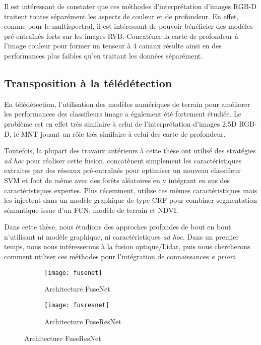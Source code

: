 Il est intéressant de constater que ces méthodes d'interprétation d'images \gls{RGB-D} traitent toutes séparément les aspects de couleur et de profondeur. En effet, comme pour le multispectral, il est intéressant de pouvoir bénéficier des modèles pré-entraînés forts sur les images \gls{RVB}. Concaténer la carte de profondeur à l'image couleur pour former un tenseur à 4 canaux résulte ainsi en des performances plus faibles qu'en traitant les données séparément.

\subsection{Transposition à la télédétection}

En télédétection, l'utilisation des modèles numériques de terrain pour améliorer les performances des classifieurs image a également été fortement étudiée. Le problème est en effet très similaire à celui de l'interprétation d'images 2,5D \gls{RGB-D}, le \gls{MNT} jouant un rôle très similaire à celui des carte de profondeur.

Toutefois, la plupart des travaux antérieurs à cette thèse ont utilisé des stratégies \emph{ad hoc} pour réaliser cette fusion. \citet{lagrange_benchmarking_2015} concatènent simplement les caractéristiques extraites par des réseaux pré-entraînés pour optimiser un nouveau classifieur \gls{SVM} et \citet{paisitkriangkrai_effective_2015} font de même avec des forêts aléatoires en y intégrant en sus des caractéristiques expertes. Plus récemment, \cite{liu_dense_2017} utilise ces mêmes caractéristiques mais les injectent dans un modèle graphique de type \gls{CRF} pour combiner segmentation sémantique issue d'un \gls{FCN}, modèle de terrain et \gls{NDVI}.

Dans cette thèse, nous étudions des approches profondes de bout en bout n'utilisant ni modèle graphique, ni caractéristiques \emph{ad hoc}. Dans un premier temps, nous nous intéresserons à la fusion optique/\gls{Lidar}, puis nous chercherons comment utiliser ces méthodes pour l'intégration de connaissances \emph{a priori}.

\begin{figure}[t]
  \begin{subfigure}{0.5\textwidth}
    \texttt{[image: fusenet]}
    \caption{Architecture FuseNet~\cite{hazirbas_fusenet_2016}}
    \label{fig:fusenet}
  \end{subfigure}%
  \begin{subfigure}{0.5\textwidth}
    \texttt{[image: fusresnet]}
    \caption{Architecture FuseResNet}
    \label{fig:fusresnet}
  \end{subfigure}
\end{figure}

